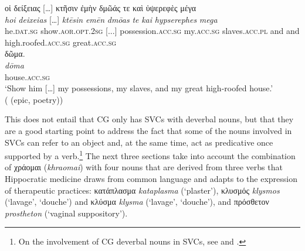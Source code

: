 \documentclass[output=paper,colorlinks,citecolor=brown]{langscibook}
\begin{document}
\begin{exe}
\ex\label{ex:Iliad29}
\glll οἱ δείξειας […] κτῆσιν ἐμὴν δμῶάς τε καὶ ὑψερεφὲς μέγα  \\ 
\textit{hoi} \textit{deixeias} […] \textit{ktēsin} \textit{emēn} \textit{dmōas} \textit{te} \textit{kai} \textit{hypserephes} \textit{mega}  \\
he.\textsc{dat.sg} show.\textsc{aor.opt.2sg} [...] possession.\textsc{acc.sg} my.\textsc{acc.sg} slaves.\textsc{acc.pl} and and high.roofed.\textsc{acc.sg} great.\textsc{acc.sg} \\

\glll δῶμα. \\
\textit{dōma} \\
house.\textsc{acc.sg} \\
\glt ‘Show him […] my possessions, my slaves, and my great high-roofed house.’ \\
\hspace*{\fill}( (epic, poetry))
\end{exe}

This does not entail that CG only has SVCs with deverbal nouns, but that they are a good starting point to address the fact that some of the nouns involved in SVCs can refer to an object and, at the same time, act as predicative once supported by a verb.\footnote{On the involvement of CG deverbal nouns in SVCs, see \citet[160--164]{Marini2010} and \citet{JiménezLópez2011}.}
The next three sections take into account the combination of χράομαι (\textit{khraomai}) with four nouns that are derived from three verbs that Hippocratic medicine draws from common language and adapts to the expression of therapeutic practices: κατάπλασμα \textit{kataplasma} (‘plaster'), κλυσμός \textit{klysmos} (‘lavage', ‘douche') and κλύσμα \textit{klysma} (‘lavage', ‘douche'), and πρόσθετον \textit{prostheton} (‘vaginal suppository').
\end{document}
